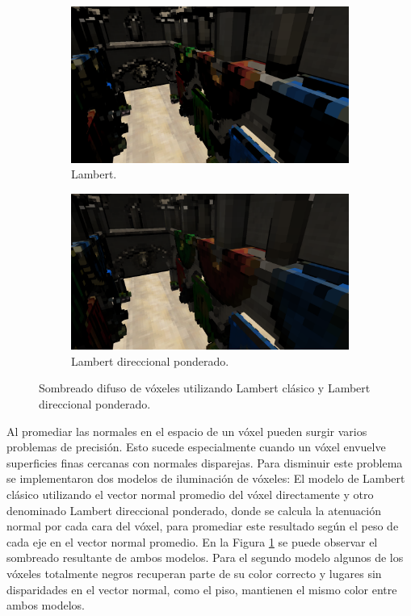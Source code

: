 \begin{figure}[H]
	\centering
	\begin{subfigure}[t]{0.49\textwidth}
		\centering
		\captionsetup{justification=centering}
		\includegraphics[width=\linewidth]{media/classic_lambert.png}
		\caption*{Lambert.}
	\end{subfigure}%
	\hspace{0.01\textwidth}
	\begin{subfigure}[t]{0.49\textwidth}
		\centering
		\captionsetup{justification=centering}
		\includegraphics[width=\linewidth]{media/dir_lambert.png}
		\caption*{Lambert direccional ponderado.}
	\end{subfigure}%
	\caption{Sombreado difuso de vóxeles utilizando Lambert clásico y Lambert direccional ponderado.}
	\label{fig:lambert_dir_diff}
\end{figure}

Al promediar las normales en el espacio de un vóxel pueden surgir varios problemas de precisión. Esto sucede especialmente cuando un vóxel envuelve superficies finas cercanas con normales disparejas. Para disminuir este problema se implementaron dos modelos de iluminación de vóxeles: El modelo de Lambert clásico utilizando el vector normal promedio del vóxel directamente y otro denominado Lambert direccional ponderado, donde se calcula la atenuación normal por cada cara del vóxel, para promediar este resultado según el peso de cada eje en el vector normal promedio. En la Figura \ref{fig:lambert_dir_diff} se puede observar el sombreado resultante de ambos modelos. Para el segundo modelo algunos de los vóxeles totalmente negros recuperan parte de su color correcto y lugares sin disparidades en el vector normal, como el piso, mantienen el mismo color entre ambos modelos.

